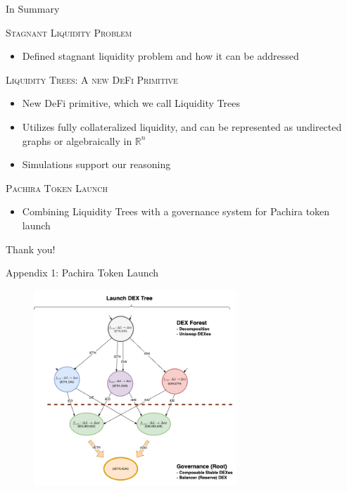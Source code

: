 \documentclass[10pt,xcolor=svgnames]{beamer} %
\begin{document}
\begin{frame}{In Summary}


\begin{exampleblock}{\textsc{Stagnant Liquidity Problem}}
\begin{itemize}
  \item Defined stagnant liquidity problem and how it can be addressed
\end{itemize}
\end{exampleblock}

\begin{exampleblock}{\textsc{Liquidity Trees: A new DeFi Primitive}}
\begin{itemize}
  \item New DeFi primitive, which we call Liquidity Trees 
  \item Utilizes fully collateralized liquidity, and can be represented as undirected graphs or algebraically in $\mathbb{R}^n$
  \item Simulations support our reasoning
\end{itemize}
\end{exampleblock}

\begin{exampleblock}{\textsc{Pachira Token Launch}}
\begin{itemize}
  \item Combining Liquidity Trees with a governance system for Pachira token launch
\end{itemize}
\end{exampleblock}



\end{frame}


\begin{frame}[standout]
  Thank you! 
\end{frame}

\begin{frame}{Appendix 1: Pachira Token Launch}
\begin{figure}[h!]
\includegraphics[width=3in]{img/dex_forest_single_tree.png}
\label{fig:dex_forest}
\end{figure}
\end{frame}
\end{document}
